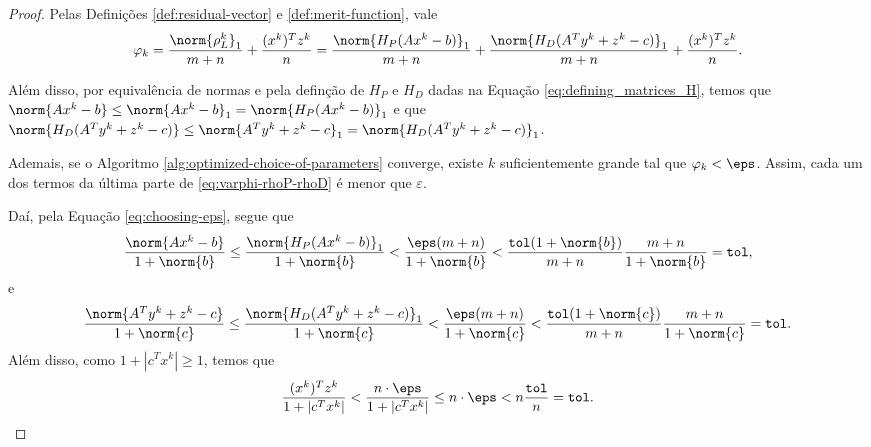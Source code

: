 \begin{proof}
	 Pelas Definições \ref{def:residual-vector} e \ref{def:merit-function}, vale
	\begin{equation}
		\label{eq:varphi-rhoP-rhoD}
				\varphi_{k} =  \frac{\norm{\rho^{k}_L}_1}{m+n} + 
\frac{(x^{k})^Tz^{k}}{n}  = \frac{\norm{H_{P}(Ax^{k} - b)}_1}{m+n} +\frac{\norm{H_{D}(A^{T}y^{k} + z^{k}- c)}_1 }{m+n} + 
\frac{(x^{k})^Tz^{k}}{n}.
	\end{equation}

Além disso, por equivalência de normas e pela definção de $H_{P}$ e $H_{D}$ dadas na Equação \eqref{eq:defining_matrices_H}, temos que $\norm{Ax^{k} - b} \leq \norm{Ax^{k} - b}_{1} = \norm{H_{P}(Ax^{k} - b)}_{1}$ e que $\norm{H_{D}(A^{T}y^{k} + z^{k}- c)} \leq \norm{A^{T}y^{k} + z^{k}- c}_1 = \norm{H_{D}(A^{T}y^{k} + z^{k}- c)}_1$.

Ademais, se  o Algoritmo \ref{alg:optimized-choice-of-parameters} converge, existe $k$ suficientemente grande tal que $\varphi_{k}<\eps$. Assim, cada um dos termos da última parte de \eqref{eq:varphi-rhoP-rhoD} é menor que $\varepsilon$.


Daí, pela Equação \eqref{eq:choosing-eps}, segue que 
\[
\dfrac{\norm{Ax^{k} - b}}{1 + \norm{b}} \leq  \frac{\norm{H_{P}(Ax^{k} - b)}_1  }{1 + \norm{b}} < \frac{\eps (m+n)}{1 + \norm{b}} <\frac{\tol(1+\norm{b})}{m+n} \frac{m+n}{1 + \norm{b}} = \tol,
\]
e
\[
\dfrac{\norm{A^{T}y^{k} + z^{k}- c}}{1 + \norm{c}} \leq  \frac{\norm{H_{D}(A^{T}y^{k} + z^{k}- c)}_{1}  }{1 + \norm{c}} < \frac{\eps (m+n)}{1 + \norm{c}} <\frac{\tol(1+\norm{c})}{m+n} \frac{m+n}{1 + \norm{c}} = \tol.
\]
Além disso, como $1+ |c^{T}x^{k}| \geq 1$, temos que 
\[
\dfrac{(x^{k})^{T}z^{k}}{1+ |c^{T}x^{k}|} <   \frac{n\cdot  \eps}{1+ |c^{T}x^{k}|} \leq n \cdot \eps < n \frac{\tol}{n} = \tol. \qedhere
\]
 \end{proof}

